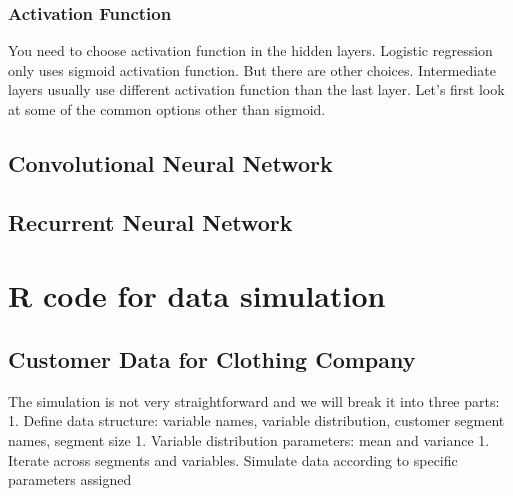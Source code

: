 \documentclass[12pt,]{krantz}
\begin{document}
\hypertarget{activation-function}{%
\subsection{Activation Function}\label{activation-function}}

You need to choose activation function in the hidden layers. Logistic regression only uses sigmoid activation function. But there are other choices. Intermediate layers usually use different activation function than the last layer. Let's first look at some of the common options other than sigmoid.

\hypertarget{convolutional-neural-network}{%
\section{Convolutional Neural Network}\label{convolutional-neural-network}}

\hypertarget{recurrent-neural-network}{%
\section{Recurrent Neural Network}\label{recurrent-neural-network}}

\hypertarget{section}{%
\subsection{}\label{section}}

\hypertarget{appendix-appendix}{%
\appendix {}}


\hypertarget{r-code-for-data-simulation}{%
\chapter{R code for data simulation}\label{r-code-for-data-simulation}}

\hypertarget{customer-data-for-clothing-company-1}{%
\section{Customer Data for Clothing Company}\label{customer-data-for-clothing-company-1}}

The simulation is not very straightforward and we will break it into three parts:
1. Define data structure: variable names, variable distribution, customer segment names, segment size
1. Variable distribution parameters: mean and variance
1. Iterate across segments and variables. Simulate data according to specific parameters assigned
\end{document}
